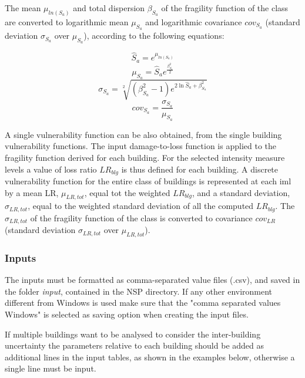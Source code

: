The mean $\mu_{ln(S_a)}$ and total dispersion $\beta_{S_a}$ of the fragility function of the class are converted to logarithmic mean $\mu_{S_a}$ and logarithmic covariance $cov_{S_a}$ (standard deviation $\sigma_{S_a}$ over $\mu_{S_a}$), according to the following equations:

\begin{equation}
\hat{S}_a = e^{\mu_{ln(S_a)}}
\end{equation}
\begin{equation}
\mu_{S_a} = \hat{S}_a e^{\frac{\beta_{S_a}^2}{2}}
\label{eq:median-to-mean}
\end{equation}
\begin{equation}
\sigma_{S_a} = \sqrt[2]{(\beta_{S_a}^2-1) e^{2\ln{ \hat{S}_a}+\beta_{S_a}^2}}
\label{eq:dispersion-to-standard}
\end{equation}
\begin{equation}
cov_{S_a} = \frac{\sigma_{S_a}}{\mu_{S_a} }
\end{equation}

A single vulnerability function can be also obtained, from the single building vulnerability functions. The input damage-to-loss function is applied to the fragility function derived for each building. For the selected intensity measure levels a value of loss ratio $LR_{blg}$ is thus defined for each building. A discrete vulnerability function for the entire class of buildings is represented at each iml by a mean LR, $\mu_{LR,tot}$, equal tot the weighted $LR_{blg}$, and a standard deviation, $\sigma_{LR, tot}$, equal to the weighted standard deviation of all the computed $LR_{blg}$. The $\sigma_{LR, tot}$ of the fragility function of the class is converted to covariance $cov_{LR}$ (standard deviation $\sigma_{LR, tot}$ over $\mu_{LR, tot}$).

\subsubsection{Inputs}
\label{subsubsec:InputCr}
The inputs must be formatted as comma-separated value files (.csv), and saved in the folder \textit{input}, contained in the NSP directory. If any other environment different from Windows is used make sure that the "comma separated values Windows" is selected as saving option when creating the input files. 

If multiple buildings want to be analysed to consider the inter-building uncertainty the parameters relative to each building should be added as additional lines in the input tables, as shown in the examples below, otherwise a single line must be input.

